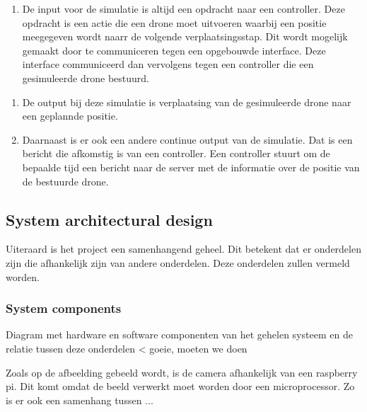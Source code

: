     \begin{description}\setlength{\itemindent}{0.1cm}
        \item[INPUT:] \hfill
        \begin{enumerate}
            \item De input voor de simulatie is altijd een opdracht naar een controller. Deze opdracht is een
            actie die een drone moet uitvoeren waarbij een positie meegegeven wordt  naarr de volgende verplaatsingsstap.
            Dit wordt mogelijk gemaakt door te communiceren tegen een opgebouwde interface. Deze
            interface communiceerd dan vervolgens tegen een controller die een gesimuleerde drone bestuurd.
        \end{enumerate}
        \newpage
        \item[OUTPUT:] \hfill
        \begin{enumerate}
            \item De output bij deze simulatie is verplaatsing van de gesimuleerde drone naar een geplannde positie.
            \item Daarnaast is er ook een andere continue output van de simulatie. Dat is een bericht die afkomstig
            is van een controller. Een controller stuurt om de bepaalde tijd een bericht naar de server met
            de informatie over de positie van de bestuurde drone.
        \end{enumerate}


    \end{description}

    \newpage
\subsection{System architectural design}
Uiteraard is het project een samenhangend geheel. Dit betekent dat er onderdelen zijn die afhankelijk zijn van andere onderdelen. Deze onderdelen zullen vermeld worden.

\subsubsection*{System components}
Diagram met hardware en software componenten van het gehelen systeem en de relatie tussen deze onderdelen < goeie, moeten we doen

Zoals op de afbeelding gebeeld wordt, is de camera afhankelijk van een raspberry pi. Dit komt omdat de beeld verwerkt moet worden door een microprocessor. Zo is er ook een samenhang tussen ...
